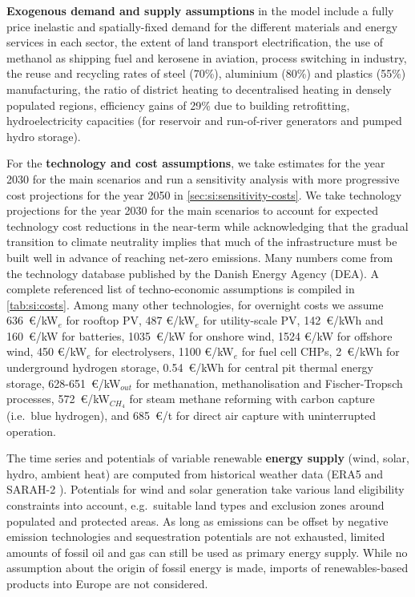 \textbf{Exogenous demand and supply assumptions} in the model include a fully
price inelastic and spatially-fixed demand for the different materials and
energy services in each sector, the extent of land transport electrification,
the use of methanol as shipping fuel and kerosene in aviation, process switching
in industry, the reuse and recycling rates of steel (70\%), aluminium (80\%) and
plastics (55\%) manufacturing, the ratio of district heating to decentralised
heating in densely populated regions, efficiency gains of 29\% due to building
retrofitting, hydroelectricity capacities (for reservoir and run-of-river
generators and pumped hydro storage).

For the \textbf{technology and cost assumptions}, we take estimates for the year
2030 for the main scenarios and run a sensitivity analysis with more progressive
cost projections for the year 2050 in \cref{sec:si:sensitivity-costs}. We take
technology projections for the year 2030 for the main scenarios to account for
expected technology cost reductions in the near-term while acknowledging that
the gradual transition to climate neutrality implies that much of the
infrastructure must be built well in advance of reaching net-zero emissions.
Many numbers come from the technology database published by the Danish Energy
Agency (DEA). A complete referenced list of techno-economic
assumptions is compiled in \cref{tab:si:costs}. Among many other technologies,
for overnight costs we assume 636~\euro/kW$_e$ for rooftop PV, 487 \euro/kW$_e$
for utility-scale PV, 142~\euro/kWh and 160~\euro/kW for batteries,
1035~\euro/kW for onshore wind, 1524 \euro/kW for offshore wind, 450
\euro/kW$_e$ for electrolysers, 1100 \euro/kW$_e$ for fuel cell CHPs,
2~\euro/kWh for underground hydrogen storage, 0.54~\euro/kWh for central pit
thermal energy storage, 628-651~\euro/kW$_{out}$ for methanation,
methanolisation and Fischer-Tropsch processes, 572~\euro/kW$_{CH_4}$ for steam
methane reforming with carbon capture (i.e.~blue hydrogen), and 685~\euro/t for
direct air capture with uninterrupted operation.

The time series and potentials of variable renewable \textbf{energy supply}
(wind, solar, hydro, ambient heat) are computed from historical weather data
(ERA5 \cite{ecmwf} and SARAH-2 \cite{SARAH}). Potentials for wind and solar
generation take various land eligibility constraints into account, e.g.~suitable
land types and exclusion zones around populated and protected areas. As long as
emissions can be offset by negative emission technologies and sequestration
potentials are not exhausted, limited amounts of fossil oil and gas can still be
used as primary energy supply. While no assumption about the origin of fossil
energy is made, imports of renewables-based products into Europe are not
considered.


